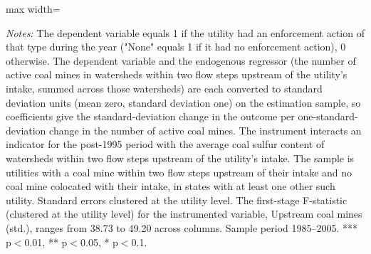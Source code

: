 \begin{table}[htbp]
{\begin{adjustbox}{max width=\linewidth}
\begin{tabular}
\bottomrule
\end{tabular}
\end{adjustbox}
}
\begin{minipage}{\linewidth}
\vspace{4pt}
\footnotesize
\raggedright
\textit{Notes:} The dependent variable equals 1 if the utility had an enforcement action of that type during the year ("None" equals 1 if it had no enforcement action), 0 otherwise. The dependent variable and the endogenous regressor (the number of active coal mines in watersheds within two flow steps upstream of the utility's intake, summed across those watersheds) are each converted to standard deviation units (mean zero, standard deviation one) on the estimation sample, so coefficients give the standard-deviation change in the outcome per one-standard-deviation change in the number of active coal mines. The instrument interacts an indicator for the post-1995 period with the average coal sulfur content of watersheds within two flow steps upstream of the utility's intake. The sample is utilities with a coal mine within two flow steps upstream of their intake and no coal mine colocated with their intake, in states with at least one other such utility. Standard errors clustered at the utility level. The first-stage F-statistic (clustered at the utility level) for the instrumented variable, Upstream coal mines (std.), ranges from 38.73 to 49.20 across columns. Sample period 1985--2005. *** p$<$0.01, ** p$<$0.05, * p$<$0.1.
\end{minipage}
\end{table}
